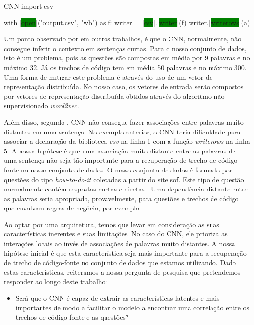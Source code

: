 \begin{mypython-linenumber}{CNN}
import csv

with |\colorbox{green}{open}|("output.csv", "wb") as f:
    writer = |\colorbox{green}{csv}|.|\colorbox{green}{writer}|(f)
    writer.|\colorbox{green}{writerows}|(a)
\end{mypython-linenumber}

Um ponto observado por \cite{tom-young:trends-deep-learning-nlp} em outros trabalhos, é que o CNN, normalmente, não consegue inferir o contexto em sentenças curtas. Para o nosso conjunto de dados, isto é um problema, pois as questões são compostas em média por 9 palavras e no máximo 32. Já os trechos de código tem em média 50 palavras e no máximo 300. Uma forma de mitigar este problema é através do uso de um vetor de representação distribuída. No nosso caso, os vetores de entrada serão compostos por vetores de representação distribuída obtidos através do algoritmo não-supervisionado \textit{word2vec}.

Além disso, segundo \cite{Goodfellow-et-al-2016}, CNN não consegue fazer associações entre palavras muito distantes em uma sentença. No exemplo anterior, o CNN teria dificuldade para associar a declaração da biblioteca \emph{csv} na linha 1 com a função \emph{writerows} na linha 5. A nossa hipótese é que uma associação muito distante entre as palavras de uma sentença não seja tão importante para a recuperação de trecho de código-fonte no nosso conjunto de dados. O nosso conjunto de dados é formado por questões do tipo \textit{how-to-do-it} coletadas a partir do site \gls{sof}. Este tipo de questão normalmente contém respostas curtas e diretas  \citep{yao-2018}. Uma dependência distante entre as palavras seria apropriado, provavelmente, para questões e trechos de código que envolvam regras de negócio, por exemplo.


Ao optar por uma arquitetura, temos que levar em consideração as suas características inerentes e suas limitações. No caso do CNN, ele prioriza as interações locais ao invés de associações de palavras muito distantes. A nossa hipótese inicial é que esta característica seja mais importante para a recuperação de trecho de código-fonte no conjunto de dados que estamos utilizando. Dado estas características, reiteramos a nossa pergunta de pesquisa que pretendemos responder ao longo deste trabalho:

\begin{itemize}
    \item Será que o CNN é capaz de extrair as características latentes e mais importantes de modo a facilitar o modelo a encontrar uma correlação entre os trechos de código-fonte e as questões?
\end{itemize}

